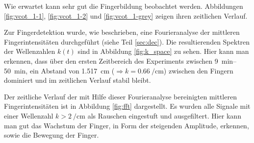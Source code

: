 Wie erwartet kann sehr gut die Fingerbildung beobachtet werden. Abbildungen \ref{fig:vcot_1-1}, \ref{fig:vcot_1-2} und \ref{fig:vcot_1-grey} zeigen ihren zeitlichen Verlauf.




Zur Fingerdetektion wurde, wie beschrieben, eine Fourieranalyse der mittleren Fingerintensitäten durchgeführt (siehe Teil \ref{sec:dec}). Die resultierenden Spektren der Wellenzahlen $k(t)$ sind in Abbildung \ref{fig:k_space} zu sehen. Hier kann man erkennen, dass über den ersten Zeitbereich des Experiments zwischen \SIrange{9}{50}{\minute}, ein Abstand von \SI[round-precision=2]{1,517}{\centi\meter} ($\Rightarrow k=\SI[round-precision=2]{0,66}{\per\centi\meter}$) zwischen den Fingern dominiert und im zeitlichen Verlauf stabil bleibt. 

Der zeitliche Verlauf der mit Hilfe dieser Fourieranalyse bereinigten mittleren Fingerintensitäten ist in Abbildung \ref{fig:fft} dargestellt. Es wurden alle Signale mit einer Wellenzahl $k > \SI{2}{\per\centi\meter}$ als Rauschen eingestuft und ausgefiltert. Hier kann man gut das Wachstum der Finger, in Form der steigenden Amplitude, erkennen, sowie die Bewegung der Finger. %



